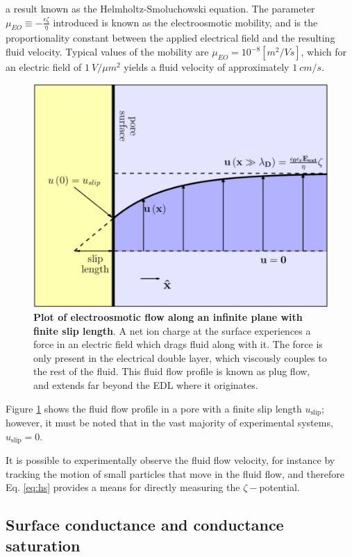 			

			
			a result known as the Helmholtz-Smoluchowski equation. The parameter $\mu_{EO}\equiv-\frac{\epsilon\zeta}{\eta}$ introduced is known as the electroosmotic mobility, and is the proportionality constant between the applied electrical field and the resulting fluid velocity. Typical values of the mobility are $\mu_{EO}=10^{-8} \left[m^{2}/V s\right]$, which for an electric field of $\SI{1}{V/\mu m^{2}}$ yields a fluid velocity of approximately $\SI{1}{cm/s}$. 
			
			\begin{figure}
				\includegraphics[width=.5\textwidth]{electroosmosis.png}
				\caption{\textbf{Plot of electroosmotic flow along an infinite plane with finite slip length}. A net ion charge at the surface experiences a force in an electric field which drags fluid along with it. The force is only present in the electrical double layer, which viscously couples to the rest of the fluid. This fluid flow profile is known as plug flow, and extends far beyond the EDL where it originates.}
				\label{fig:electroosmosis}
			\end{figure}
			
			Figure \ref{fig:electroosmosis} shows the fluid flow profile in a pore with a finite slip length $u_{\mathrm{slip}}$; however, it must be noted that in the vast majority of experimental systems, $u_{\mathrm{slip}}=0$.
			
			It is possible to experimentally observe the fluid flow velocity, for instance by tracking the motion of small particles that move in the fluid flow, and therefore Eq. \ref{eq:hs} provides a means for directly measuring the $\zeta-$potential.
			
		\subsection{Surface conductance and conductance saturation}
		
